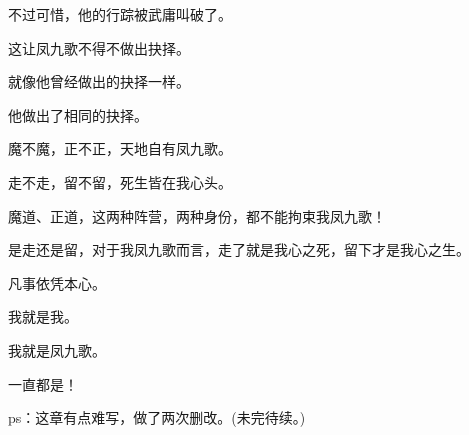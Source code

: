 \begin{this_body}
不过可惜，他的行踪被武庸叫破了。

这让凤九歌不得不做出抉择。

就像他曾经做出的抉择一样。

他做出了相同的抉择。

魔不魔，正不正，天地自有凤九歌。

走不走，留不留，死生皆在我心头。

魔道、正道，这两种阵营，两种身份，都不能拘束我凤九歌！

是走还是留，对于我凤九歌而言，走了就是我心之死，留下才是我心之生。

凡事依凭本心。

我就是我。

我就是凤九歌。

一直都是！

ps：这章有点难写，做了两次删改。(未完待续。)

\end{this_body}

